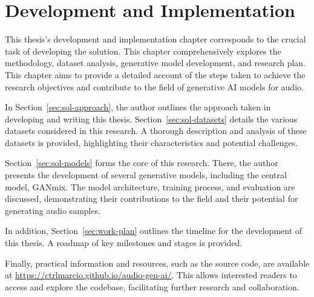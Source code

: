 \chapter{Development and Implementation} \label{chap:solution}

\minitoc

This thesis's development and implementation chapter corresponds to the crucial task of developing the solution. This chapter comprehensively explores the methodology, dataset analysis, generative model development, and research plan. This chapter aims to provide a detailed account of the steps taken to achieve the research objectives and contribute to the field of generative AI models for audio.

In Section~\ref{sec:sol-approach}, the author outlines the approach taken in developing and writing this thesis. Section~\ref{sec:sol-datasets} details the various datasets considered in this research. A thorough description and analysis of these datasets is provided, highlighting their characteristics and potential challenges. 

Section~\ref{sec:sol-models} forms the core of this research. There, the author presents the development of several generative models, including the central model, GANmix. The model architecture, training process, and evaluation are discussed, demonstrating their contributions to the field and their potential for generating audio samples.

In addition, Section~\ref{sec:work-plan} outlines the timeline for the development of this thesis. A roadmap of key milestones and stages is provided.

Finally, practical information and resources, such as the source code, are available at \url{https://ctrlmarcio.github.io/audio-gen-ai/}. This allows interested readers to access and explore the codebase, facilitating further research and collaboration.




